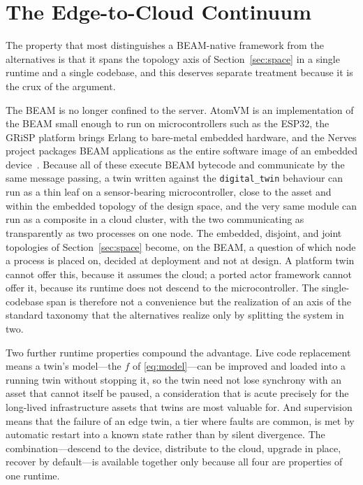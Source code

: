 \documentclass[conference]{IEEEtran}
\newcommand{\beam}{BEAM\xspace}
\begin{document}
\section{The Edge-to-Cloud Continuum}
\label{sec:edge}
The property that most distinguishes a \beam-native framework from the
alternatives is that it spans the topology axis of Section~\ref{sec:space} in a
single runtime and a single codebase, and this deserves separate treatment
because it is the crux of the argument.

The \beam is no longer confined to the server. AtomVM is an implementation of
the \beam small enough to run on microcontrollers such as the ESP32, the GRiSP
platform brings Erlang to bare-metal embedded hardware, and the Nerves project
packages \beam applications as the entire software image of an embedded
device~\cite{atomvm,grisp,nerves}. Because all of these execute \beam bytecode
and communicate by the same message passing, a twin written against the
\texttt{digital\_twin} behaviour can run as a thin leaf on a sensor-bearing
microcontroller, close to the asset and within the embedded topology of the
design space, and the very same module can run as a composite in a cloud
cluster, with the two communicating as transparently as two processes on one
node. The embedded, disjoint, and joint topologies of Section~\ref{sec:space}
become, on the \beam, a question of which node a process is placed on, decided at
deployment and not at design. A platform twin cannot offer this, because it
assumes the cloud; a ported actor framework cannot offer it, because its runtime
does not descend to the microcontroller. The single-codebase span is therefore
not a convenience but the realization of an axis of the standard taxonomy that
the alternatives realize only by splitting the system in two.

Two further runtime properties compound the advantage. Live code replacement
means a twin's model---the $f$ of \eqref{eq:model}---can be improved and loaded
into a running twin without stopping it, so the twin need not lose synchrony
with an asset that cannot itself be paused, a consideration that is acute
precisely for the long-lived infrastructure assets that twins are most valuable
for. And supervision means that the failure of an edge twin, a tier where faults
are common, is met by automatic restart into a known state rather than by
silent divergence. The combination---descend to the device, distribute to the
cloud, upgrade in place, recover by default---is available together only because
all four are properties of one runtime.
\end{document}
